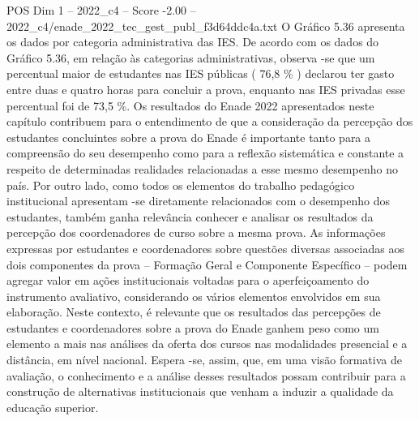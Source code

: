\begin{textsample}{POS Dim 1 – 2022\_c4 – Score -2.00 – 2022\_c4/enade\_2022\_tec\_gest\_publ\_f3d64ddc4a.txt}
O Gráfico 5.36 apresenta os dados por categoria administrativa das IES.
De acordo com os dados do Gráfico 5.36, em relação às categorias administrativas, observa -se que um percentual maior de estudantes nas IES públicas ( 76,8 \% ) declarou ter gasto entre duas e quatro horas para concluir a prova, enquanto nas IES privadas esse percentual foi de 73,5 \%.
Os resultados do Enade 2022 apresentados neste capítulo contribuem para o entendimento de que a consideração da percepção dos estudantes concluintes sobre a prova do Enade é importante tanto para a compreensão do seu desempenho como para a reflexão sistemática e constante a respeito de determinadas realidades relacionadas a esse mesmo desempenho no país.
Por outro lado, como todos os elementos do trabalho pedagógico institucional apresentam -se diretamente relacionados com o desempenho dos estudantes, também ganha relevância conhecer e analisar os resultados da percepção dos coordenadores de curso sobre a mesma prova.
As informações expressas por estudantes e coordenadores sobre questões diversas associadas aos dois componentes da prova – Formação Geral e Componente Específico – podem agregar valor em ações institucionais voltadas para o aperfeiçoamento do instrumento avaliativo, considerando os vários elementos envolvidos em sua elaboração.
Neste contexto, é relevante que os resultados das percepções de estudantes e coordenadores sobre a prova do Enade ganhem peso como um elemento a mais nas análises da oferta dos cursos nas modalidades presencial e a distância, em nível nacional.
Espera -se, assim, que, em uma visão formativa de avaliação, o conhecimento e a análise desses resultados possam contribuir para a construção de alternativas institucionais que venham a induzir a qualidade da educação superior.

\end{textsample}
